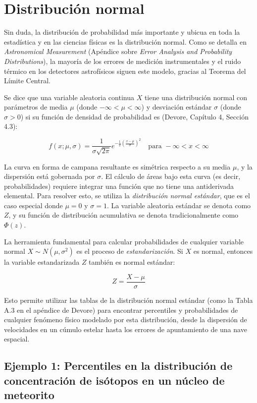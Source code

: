 \section{Distribución normal}

Sin duda, la distribución de probabilidad más importante y ubicua en toda la estadística y en las ciencias físicas es la distribución normal. Como se detalla en \textit{Astronomical Measurement} (Apéndice sobre \textit{Error Analysis and Probability Distributions}), la mayoría de los errores de medición instrumentales y el ruido térmico en los detectores astrofísicos siguen este modelo, gracias al Teorema del Límite Central.

Se dice que una variable aleatoria continua $X$ tiene una distribución normal con parámetros de media $\mu$ (donde $-\infty < \mu < \infty$) y desviación estándar $\sigma$ (donde $\sigma > 0$) si su función de densidad de probabilidad es (Devore, Capítulo 4, Sección 4.3):

$$ f(x; \mu, \sigma) = \frac{1}{\sigma \sqrt{2\pi}} e^{-\frac{1}{2}\left(\frac{x-\mu}{\sigma}\right)^2} \quad \text{para } -\infty < x < \infty $$

La curva en forma de campana resultante es simétrica respecto a su media $\mu$, y la dispersión está gobernada por $\sigma$. El cálculo de áreas bajo esta curva (es decir, probabilidades) requiere integrar una función que no tiene una antiderivada elemental. Para resolver esto, se utiliza la \textit{distribución normal estándar}, que es el caso especial donde $\mu = 0$ y $\sigma = 1$. La variable aleatoria estándar se denota como $Z$, y su función de distribución acumulativa se denota tradicionalmente como $\Phi(z)$.

La herramienta fundamental para calcular probabilidades de cualquier variable normal $X \sim N(\mu, \sigma^2)$ es el proceso de \textit{estandarización}. Si $X$ es normal, entonces la variable estandarizada $Z$ también es normal estándar:

$$ Z = \frac{X - \mu}{\sigma} $$

Esto permite utilizar las tablas de la distribución normal estándar (como la Tabla A.3 en el apéndice de Devore) para encontrar percentiles y probabilidades de cualquier fenómeno físico modelado por esta distribución, desde la dispersión de velocidades en un cúmulo estelar hasta los errores de apuntamiento de una nave espacial.

\subsection{Ejemplo 1: Percentiles en la distribución de concentración de isótopos en un núcleo de meteorito}

